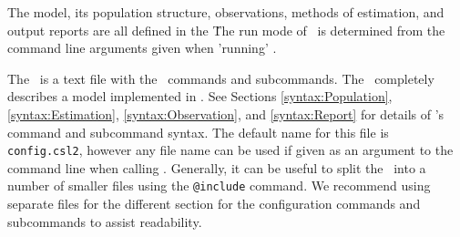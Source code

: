 The model, its population structure, observations, methods of estimation, and output reports are all defined in the \config\. The run mode of \CNAME\ is determined from the command line arguments given when 'running' \CNAME.

The \config\ is a text file with the \CNAME\ commands and subcommands. The \config\ completely describes a model implemented in \CNAME. See Sections \ref{syntax:Population}, \ref{syntax:Estimation}, \ref{syntax:Observation}, and \ref{syntax:Report} for details of \CNAME's command and subcommand syntax.  The default name for this file is \texttt{config.csl2}, however any file name can be used if given as an argument to the command line when calling \CNAME. Generally, it can be useful to split the \config\ into a number of smaller files using the \texttt{@include} command. We recommend using separate files for the different section for the configuration commands and subcommands to assist readability.
